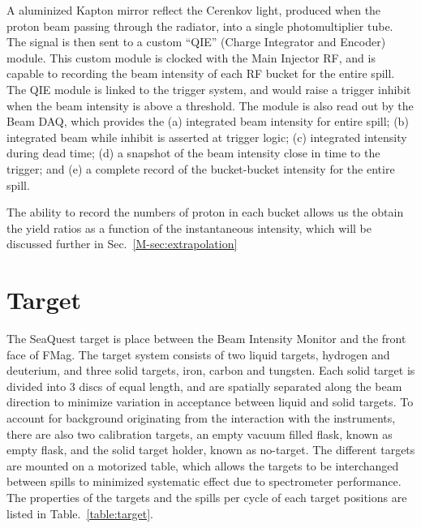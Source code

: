 \documentclass[../main.tex]{subfiles}
\begin{document}
A aluminized Kapton mirror reflect the Cerenkov light, produced when the proton beam
passing through the radiator, into a single photomultiplier tube. The signal is then
sent to a custom ``QIE'' (Charge Integrator and Encoder) module. This custom module
is clocked with the Main Injector RF, and is capable to recording the beam intensity
of each RF bucket for the entire spill. The QIE module is linked to the trigger
system, and would raise a trigger inhibit when the beam intensity is above a
threshold. The module is also read out by the Beam DAQ, which provides the (a)
integrated beam intensity for entire spill; (b) integrated beam while inhibit is
asserted at trigger logic; (c) integrated intensity during dead time; (d) a snapshot
of the beam intensity close in time to the trigger; and (e) a complete record of the
bucket-bucket intensity for the entire spill.

The ability to record the numbers of proton in each bucket allows us the obtain the
yield ratios as a function of the instantaneous intensity, which will be discussed
further in Sec.\ \ref{M-sec:extrapolation}


\section{Target}
The SeaQuest target is place between the Beam Intensity Monitor and the front face
of FMag. The target system consists of two liquid targets, hydrogen and deuterium,
and three solid targets, iron, carbon and tungsten. Each solid target is divided
into \num{3} discs of equal length, and are spatially separated along the beam
direction to minimize variation in acceptance between liquid and solid targets.
To account for background originating from the interaction with the instruments,
there are also two calibration targets, an empty vacuum filled flask, known as
empty flask, and the solid target holder, known as no-target. The different targets
are mounted on a motorized table, which allows the targets to be interchanged
between spills to minimized systematic effect due to spectrometer performance.
The properties of the targets and the spills per cycle of each target positions
are listed in Table.\ \ref{table:target}.
\end{document}
